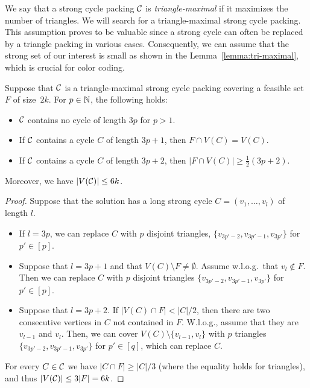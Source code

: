 We say that a strong cycle packing $\mathcal C$ is \emph{triangle-maximal} if it maximizes the number of triangles.
We will search for a triangle-maximal strong cycle packing.
This assumption proves to be valuable since a strong cycle can often be replaced by a triangle packing in various cases.
Consequently, we can assume that the strong set of our interest is small as shown in the Lemma~\ref{lemma:tri-maximal}, which is crucial for color coding.
\begin{lemma} \label{lemma:tri-maximal}
  Suppose that $\mathcal C$ is a triangle-maximal strong cycle packing covering a feasible set $F$ of size~$2k$.
  For $p \in \mathbb N$, the following holds:
  \begin{itemize}
    \item $\mathcal C$ contains no cycle of length $3p$ for $p > 1$.
    \item If $\mathcal C$ contains a cycle $C$ of length $3p + 1$, then $F \cap V(C) = V(C)$.
    \item If $\mathcal C$ contains a cycle $C$ of length $3p + 2$, then $|F \cap V(C)| \ge \frac{1}{2} (3p +2)$.
  \end{itemize}
  Moreover, we have $|V(\mathcal C)| \le 6k$.
\end{lemma}
\begin{proof}
  Suppose that the solution has a long strong cycle $C = (v_1, \dots, v_l)$ of length $l$.
  \begin{itemize}
    \item 
    If $l = 3p$, we can replace $C$ with $p$ disjoint triangles, $\{ v_{3p' - 2}, v_{3p' - 1}, v_{3p'} \}$ for $p' \in [p]$.
    \item
    Suppose that $l = 3p + 1$ and that $V(C) \setminus F \ne \emptyset$.
    Assume w.l.o.g.\ that $v_{l} \notin F$.
    Then we can replace $C$ with $p$ disjoint triangles $\{ v_{3p' - 2}, v_{3p' - 1}, v_{3p'} \}$ for $p' \in [p]$.
    \item
    Suppose that $l = 3p + 2$.
    If $|V(C) \cap F| < |C| / 2$, then there are two consecutive vertices in $C$ not contained in $F$.
    W.l.o.g., assume that they are $v_{l - 1}$ and $v_{l}$.
    Then, we can cover $V(C) \setminus \{ v_{l - 1}, v_l \}$ with $p$ triangles $\{ v_{3p' - 2}, v_{3p' - 1}, v_{3p'} \}$ for $p' \in [q]$, which can replace $C$.
  \end{itemize}
  For every $C \in \mathcal C$ we have $|C \cap F| \ge |C| / 3$ (where the equality holds for triangles), and thus $|V(\mathcal C)| \le 3 |F| = 6k$.
\end{proof}

